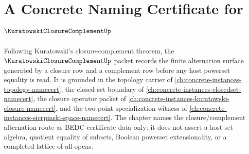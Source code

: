 \chapter{A Concrete Naming Certificate for $\KuratowskiClosureComplementUp$}
\label{ch:concrete-instances-kuratowski-closure-complement-namecert}

Following Kuratowski's closure-complement theorem, the $\KuratowskiClosureComplementUp$ packet records the finite alternation surface generated by a closure row and a complement row before any host powerset equality is read. It is grounded in the topology carrier of \autoref{ch:concrete-instances-topology-namecert}, the closed-set boundary of \autoref{ch:concrete-instances-closedset-namecert}, the closure operator packet of \autoref{ch:concrete-instances-kuratowski-closure-namecert}, and the two-point specialization witness of \autoref{ch:concrete-instances-sierpinski-space-namecert}. The chapter names the closure/complement alternation route as BEDC certificate data only; it does not assert a host set algebra, quotient equality of subsets, Boolean powerset extensionality, or a completed lattice of all opens.

